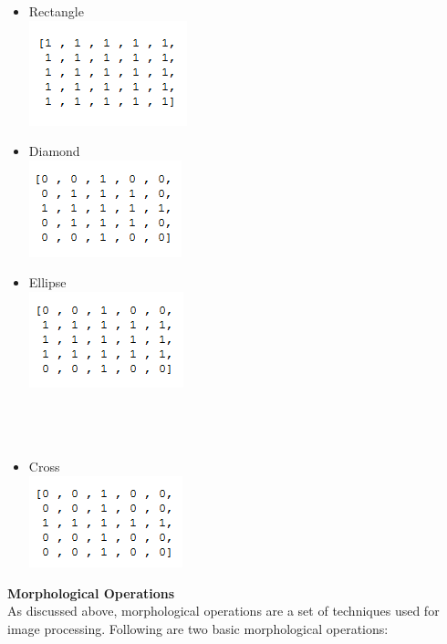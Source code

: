 \documentclass{article}
\begin{document}
\begin{flushleft}
	\begin{itemize}
		\item Rectangle \\ 
		\includegraphics{Rectangle.png} \\
		\item Diamond \\ 
		\includegraphics{Diamond.png} \\
			\item Ellipse \\ 
			\includegraphics{Ellipse.png} \\ \hspace{0.5pt} \\
			\hspace{0.5pt} \\
			\hspace{0.5pt} \\
			\item Cross \\
			\includegraphics{Cross.png} \\
	\end{itemize}
	\huge \textbf{Morphological Operations}	\\
	\large As discussed above, morphological operations are a set of techniques used for image processing. Following are two basic morphological operations:
	

\end{flushleft}
\end{document}
